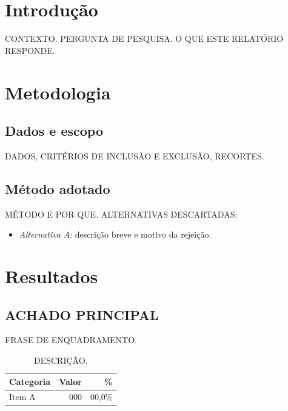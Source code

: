 \documentclass[12pt, a4paper]{article}
\let\oldsection\section
\renewcommand{\section}{\FloatBarrier\oldsection}
\begin{document}
\makecover

\tableofcontents
\cleardoublepage

\pagestyle{fancy}

\section{Introdução}

CONTEXTO. PERGUNTA DE PESQUISA. O QUE ESTE RELATÓRIO RESPONDE.

\section{Metodologia}

\subsection{Dados e escopo}

DADOS, CRITÉRIOS DE INCLUSÃO E EXCLUSÃO, RECORTES.

\subsection{Método adotado}

MÉTODO E POR QUE. ALTERNATIVAS DESCARTADAS:

\begin{itemize}
  \item \textit{Alternativa A}: descrição breve e motivo da rejeição.
\end{itemize}

\section{Resultados}

\subsection{ACHADO PRINCIPAL}

FRASE DE ENQUADRAMENTO.

\begin{table}[H]
\centering
\caption{DESCRIÇÃO.}
\label{tab:principal}
\begin{tabular}{lrr}
\toprule
\textbf{Categoria} & \textbf{Valor} & \textbf{\%} \\
\midrule
Item A & 000 & 00,0\% \\
\bottomrule
\end{tabular}
\end{table}
\end{document}
